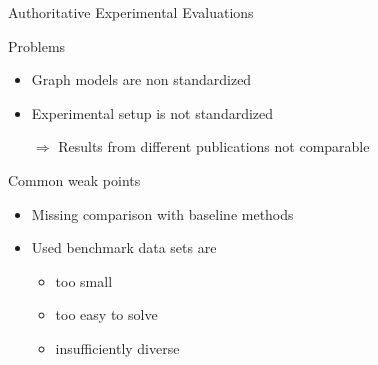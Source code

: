 \documentclass[utf8, xcolor=dvipsnames,ngerman]{beamer}
\begin{document}
\begin{frame}{Authoritative Experimental Evaluations}

\begin{block}{Problems}
 \begin{itemize}
  \item Graph models are non standardized 
  \item Experimental setup is not standardized
  \item[$\Rightarrow$] Results from different publications not comparable
 \end{itemize}
\end{block}

\vspace{.8em}
\pause

\begin{block}{Common weak points}
 \begin{itemize}
  \item Missing comparison with baseline methods
  \item Used benchmark data sets are 
  \begin{itemize}
    \item too small
    \item too easy to solve 
    \item insufficiently diverse
  \end{itemize}
 \end{itemize}
\end{block}
 
\end{frame}
\end{document}
